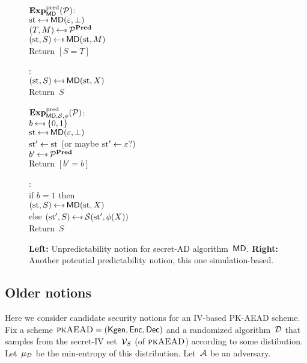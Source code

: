 \begin{figure}
\begin{center}
{
 \underline{$\mathbf{Exp}^{\mathrm{pred}}_{\mathsf{MD}}{({\cal P})}$}:\\[2pt]
 $\st \getsr \mdalg(\emptystring,\bot)$\\
 $ (T,M)\getsr\advP^{\predOracle}$\\
 $ (\st,\seciv) \getsr \mdalg(\st,M)$\\
 Return $[S=T]$

\medskip
 :\\[2pt]
 $(\st,\seciv) \getsr \mdalg(\st,X)$\\
 Return~$S$
}
{
\underline{$\mathbf{Exp}^{\mathrm{pred}}_{\mathsf{MD},{\mathcal S},\phi}{({\cal P})}$}:\\[2pt]
$b \getsr \bits$\\ 
$\st \getsr \mdalg(\emptystring,\bot)$\\
$\mathrm{st}' \gets \mathrm{st}$ (or maybe $\mathrm{st}'\gets\varepsilon$?)\\
$ b'\getsr\advP^{\predOracle}$\\
 Return $[b'=b]$ 

\medskip
 :\\[2pt]
 if $b=1$ then\\$(\st,\seciv) \getsr \mdalg(\st,X)$\\
 else $(\st',\seciv) \getsr \simulator(\st',\phi(X))$\\
 Return~$S$
 }
\caption{ {\bf Left:} Unpredictability notion for secret-AD algorithm~$\mathsf{MD}$. {\bf Right:} Another potential predictability notion, this one simulation-based.}  
\label{fig:pred-notions}
\end{center}
\end{figure}

\subsection{Older notions}
Here we consider candidate security notions for an IV-based PK-AEAD scheme.  Fix a scheme $\textsc{pkAEAD}=(\mathsf{Kgen},{\mathsf{Enc}},{\mathsf{Dec}})$ and a randomized algorithm~${\cal D}$ that samples from the secret-IV set~$\mathcal{V}_S$ (of $\textsc{pkAEAD}$) according to some distibution.  Let~$\mu_{\cal D}$ be the min-entropy of this distribution.  Let~${\cal A}$ be an adversary.  

